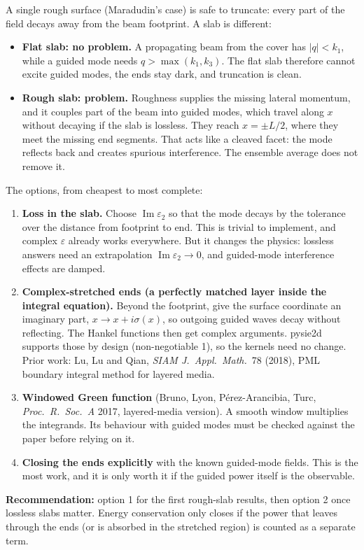 \documentclass[11pt,a4paper]{article}
\begin{document}
A single rough surface (Maradudin's case) is safe to truncate: every part of
the field decays away from the beam footprint. A slab is different:
\begin{itemize}
  \item \textbf{Flat slab: no problem.} A propagating beam from the cover has
        $|q|<k_1$, while a guided mode needs $q>\max(k_1,k_3)$. The flat slab
        therefore cannot excite guided modes, the ends stay dark, and truncation is clean.
  \item \textbf{Rough slab: problem.} Roughness supplies the missing lateral
        momentum, and it couples part of the beam into guided modes, which
        travel along $x$ without decaying if the slab is lossless. They reach
        $x=\pm L/2$, where they meet the missing end segments. That acts like a cleaved facet: the
        mode reflects back and creates spurious interference. The ensemble
        average does not remove it.
\end{itemize}
The options, from cheapest to most complete:
\begin{enumerate}
  \item \textbf{Loss in the slab.} Choose $\operatorname{Im}\varepsilon_2$ so that the mode decays
        by the tolerance over the distance from footprint to end. This is trivial to implement,
        and complex $\varepsilon$ already works everywhere. But it changes the physics:
        lossless answers need an extrapolation $\operatorname{Im}\varepsilon_2\to 0$, and
        guided-mode interference effects are damped.
  \item \textbf{Complex-stretched ends (a perfectly matched layer inside the
        integral equation).} Beyond the footprint, give the surface coordinate an
        imaginary part, $x\to x+i\sigma(x)$, so outgoing guided waves decay without
        reflecting. The Hankel functions then get complex arguments. pysie2d supports those by
        design (non-negotiable 1), so the kernels need no change. Prior work: Lu, Lu
        and Qian, \emph{SIAM J.\ Appl.\ Math.}\ 78 (2018), PML boundary integral method for
        layered media.
  \item \textbf{Windowed Green function} (Bruno, Lyon, P\'erez-Arancibia, Turc,
        \emph{Proc.\ R.\ Soc.\ A} 2017, layered-media version). A smooth window multiplies
        the integrands. Its behaviour with guided modes must be checked against the paper
        before relying on it.
  \item \textbf{Closing the ends explicitly} with the known guided-mode fields.
        This is the most work, and it is only worth it if the guided power itself is the observable.
\end{enumerate}
\textbf{Recommendation:} option 1 for the first rough-slab results, then option 2 once
lossless slabs matter. Energy conservation only closes if the power that leaves
through the ends (or is absorbed in the stretched region) is counted as a separate term.
\end{document}
